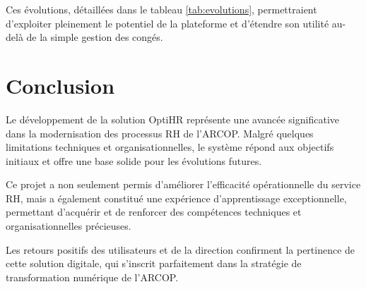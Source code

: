 Ces évolutions, détaillées dans le tableau \ref{tab:evolutions}, permettraient d'exploiter pleinement le potentiel de la plateforme et d'étendre son utilité au-delà de la simple gestion des congés.

\section{Conclusion}
Le développement de la solution OptiHR représente une avancée significative dans la modernisation des processus RH de l'ARCOP. Malgré quelques limitations techniques et organisationnelles, le système répond aux objectifs initiaux et offre une base solide pour les évolutions futures.

Ce projet a non seulement permis d'améliorer l'efficacité opérationnelle du service RH, mais a également constitué une expérience d'apprentissage exceptionnelle, permettant d'acquérir et de renforcer des compétences techniques et organisationnelles précieuses.

Les retours positifs des utilisateurs et de la direction confirment la pertinence de cette solution digitale, qui s'inscrit parfaitement dans la stratégie de transformation numérique de l'ARCOP.
\clearpage